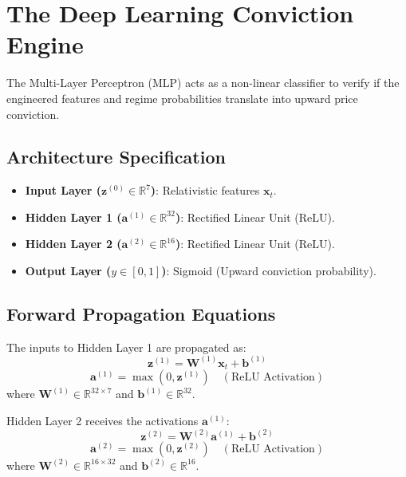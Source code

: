 \documentclass[11pt,a4paper]{article}
\begin{document}
\newpage
\section{The Deep Learning Conviction Engine}

The Multi-Layer Perceptron (MLP) acts as a non-linear classifier to verify if the engineered features and regime probabilities translate into upward price conviction.

\subsection{Architecture Specification}
\begin{itemize}
    \item \textbf{Input Layer ($\mathbf{z}^{(0)} \in \mathbb{R}^7$)}: Relativistic features $\mathbf{x}_t$.
    \item \textbf{Hidden Layer 1 ($\mathbf{a}^{(1)} \in \mathbb{R}^{32}$)}: Rectified Linear Unit ($\text{ReLU}$).
    \item \textbf{Hidden Layer 2 ($\mathbf{a}^{(2)} \in \mathbb{R}^{16}$)}: Rectified Linear Unit ($\text{ReLU}$).
    \item \textbf{Output Layer ($y \in [0, 1]$)}: Sigmoid (Upward conviction probability).
\end{itemize}

\subsection{Forward Propagation Equations}

The inputs to Hidden Layer 1 are propagated as:
\begin{equation}
    \mathbf{z}^{(1)} = \mathbf{W}^{(1)} \mathbf{x}_t + \mathbf{b}^{(1)}
\end{equation}
\begin{equation}
    \mathbf{a}^{(1)} = \max(0, \mathbf{z}^{(1)}) \quad (\text{ReLU Activation})
\end{equation}
where $\mathbf{W}^{(1)} \in \mathbb{R}^{32 \times 7}$ and $\mathbf{b}^{(1)} \in \mathbb{R}^{32}$.

Hidden Layer 2 receives the activations $\mathbf{a}^{(1)}$:
\begin{equation}
    \mathbf{z}^{(2)} = \mathbf{W}^{(2)} \mathbf{a}^{(1)} + \mathbf{b}^{(2)}
\end{equation}
\begin{equation}
    \mathbf{a}^{(2)} = \max(0, \mathbf{z}^{(2)}) \quad (\text{ReLU Activation})
\end{equation}
where $\mathbf{W}^{(2)} \in \mathbb{R}^{16 \times 32}$ and $\mathbf{b}^{(2)} \in \mathbb{R}^{16}$.
\end{document}
